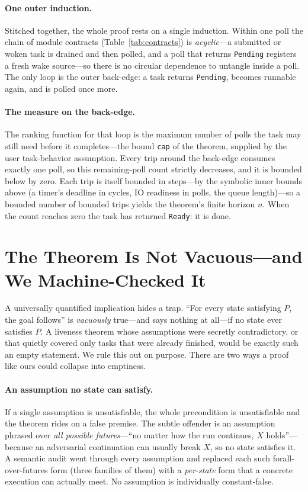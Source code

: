 \documentclass[11pt]{article}
\newcommand{\asm}[1]{\textcolor{cAssume}{#1}}
\theoremstyle{plain}
\theoremstyle{definition}
\begin{document}
\paragraph{One outer induction.} Stitched together, the whole proof rests on a single
induction. Within one poll the chain of module contracts (Table~\ref{tab:contracts}) is
\emph{acyclic}---a submitted or woken task is drained and then polled, and a poll that returns
\texttt{Pending} registers a fresh wake source---so there is no circular dependence to
untangle inside a poll. The only loop is the outer back-edge: a task returns \texttt{Pending},
becomes runnable again, and is polled once more.

\paragraph{The measure on the back-edge.} The ranking function for that loop is the maximum
number of polls the task may still need before it completes---the bound \texttt{cap} of the
theorem, supplied by the \asm{user task-behavior assumption}. Every trip around the back-edge
consumes exactly one poll, so this remaining-poll count strictly decreases, and it is bounded
below by zero. Each trip is itself bounded in steps---by the symbolic inner bounds above (a
timer's deadline in cycles, IO readiness in polls, the queue length)---so a bounded number of
bounded trips yields the theorem's finite horizon $n$. When the count reaches zero the task
has returned \texttt{Ready}: it is done.

\section{The Theorem Is Not Vacuous---and We Machine-Checked It}
\label{sec:vacuity}

A universally quantified implication hides a trap. ``For every state satisfying $P$, the goal
follows'' is \emph{vacuously} true---and says nothing at all---if no state ever satisfies $P$.
A liveness theorem whose assumptions were secretly contradictory, or that quietly covered only
tasks that were already finished, would be exactly such an empty statement. We rule this out on
purpose. There are two ways a proof like ours could collapse into emptiness.

\paragraph{An assumption no state can satisfy.} If a single assumption is unsatisfiable, the
whole precondition is unsatisfiable and the theorem rides on a false premise. The subtle
offender is an assumption phrased over \emph{all possible futures}---``no matter how the run
continues, $X$ holds''---because an adversarial continuation can usually break $X$, so no state
satisfies it. A semantic audit went through every assumption and replaced each such
forall-over-futures form (three families of them) with a \emph{per-state} form that a concrete
execution can actually meet. No assumption is individually constant-false.
\end{document}
